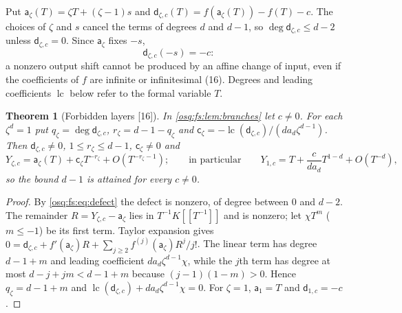 \documentclass[11pt,letterpaper]{article}
\numberwithin{equation}{section}
\newtheorem{theorem}{Theorem}[section]
\theoremstyle{definition}
\theoremstyle{remark}
\theoremstyle{plain}
\newcommand{\lc}{\operatorname{lc}}
\newcommand{\src}[1]{\textup{\textsf{[#1]}}}
\begin{document}
Put $\mathsf a_\zeta(T)=\zeta T+(\zeta-1)s$ and $\mathsf d_{\zeta,c}(T)=f(\mathsf a_\zeta(T))-f(T)-c$. The choices of $\zeta$ and $s$ cancel
the terms of degrees $d$ and $d-1$, so $\deg\mathsf d_{\zeta,c}\le d-2$ unless $\mathsf d_{\zeta,c}=0$. Since $\mathsf a_\zeta$ fixes $-s$,
\begin{equation}\label{osq:fs:eq:defect}
 \mathsf d_{\zeta,c}(-s)=-c:
\end{equation}
a nonzero output shift cannot be produced by an affine change of input, even if the coefficients of $f$ are infinite or
infinitesimal (16). Degrees and leading coefficients $\lc$ below refer to the formal variable $T$.

\begin{theorem}[Forbidden layers \src{16}]\label{osq:fs:thm:forbidden}
In \cref{osq:fs:lem:branches} let $c\ne0$. For each $\zeta^d=1$ put $q_\zeta=\deg\mathsf d_{\zeta,c}$, $r_\zeta=d-1-q_\zeta$ and
$\mathsf c_\zeta=-\lc(\mathsf d_{\zeta,c})/(da_d\zeta^{d-1})$. Then $\mathsf d_{\zeta,c}\ne0$, $1\le r_\zeta\le d-1$, $\mathsf c_\zeta\ne0$ and
\[
 Y_{\zeta,c}=\mathsf a_\zeta(T)+\mathsf c_\zeta T^{-r_\zeta}+O(T^{-r_\zeta-1});\qquad\text{in particular}\qquad
 Y_{1,c}=T+\frac{c}{da_d}T^{1-d}+O(T^{-d}),
\]
so the bound $d-1$ is attained for every $c\ne0$.
\end{theorem}
\begin{proof}
By \eqref{osq:fs:eq:defect} the defect is nonzero, of degree between $0$ and $d-2$. The remainder $R=Y_{\zeta,c}-\mathsf a_\zeta$ lies in
$T^{-1}K[[T^{-1}]]$ and is nonzero; let $\chi T^m$ ($m\le-1$) be its first term. Taylor expansion gives
$0=\mathsf d_{\zeta,c}+f'(\mathsf a_\zeta)R+\sum_{j\ge2}f^{(j)}(\mathsf a_\zeta)R^j/j!$. The linear term has degree $d-1+m$ and leading coefficient
$da_d\zeta^{d-1}\chi$, while the $j$th term has degree at most $d-j+jm<d-1+m$ because $(j-1)(1-m)>0$. Hence $q_\zeta=d-1+m$ and
$\lc(\mathsf d_{\zeta,c})+da_d\zeta^{d-1}\chi=0$. For $\zeta=1$, $\mathsf a_1=T$ and $\mathsf d_{1,c}=-c$.
\end{proof}
\end{document}
